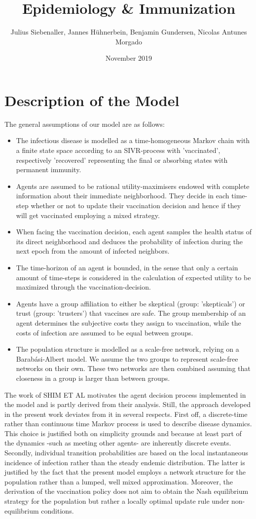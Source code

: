 \documentclass[11pt]{article}
\title{Epidemiology \& Immunization}
\author{Julius Siebenaller, Jannes Hühnerbein, Benjamin Gundersen, Nicolas Antunes Morgado}
\date{November 2019}
\begin{document}
\section{Description of the Model}


The general assumptions of our model are as follows:
\begin{itemize}
\item{The infectious disease is modelled as a time-homogeneous Markov chain with a finite state space according to an SIVR-process with 'vaccinated', respectively 'recovered' representing the final or absorbing states with permanent immunity.}
\item{Agents are assumed to be rational utility-maximisers endowed with complete information about their immediate neighborhood. They decide in each time-step whether or not to update their vaccination decision and hence if they will get vaccinated employing a mixed strategy.}
\item{When facing the vaccination decision, each agent samples the health status of its direct neighborhood and deduces the probability of infection during the next epoch from the amount of infected neighbors.}
\item{The time-horizon of an agent is bounded, in the sense that only a certain amount of time-steps is considered in the calculation of expected utility to be maximized through the vaccination-decision.}
\item{Agents have a group affiliation to either be skeptical (group: 'skepticals') or trust (group: 'trusters') that vaccines are safe. The group membership of an agent determines the subjective costs they assign to vaccination, while the costs of infection are assumed to be equal between groups.}
\item{The population structure is modelled as a scale-free network, relying on a Barabási-Albert model. We assume the two groups to represent scale-free networks on their own. These two networks are then combined assuming that closeness in a group is larger than between groups.}
\end{itemize}
The work of SHIM ET AL motivates the agent decision process implemented in the model and is partly derived from their analysis. Still, the approach developed in the present work deviates from it in several respects. First off, a discrete-time rather than continuous time Markov process is used to describe disease dynamics. This choice is justified both on simplicity grounds and because at least part of the dynamics -such as meeting other agents- are inherently discrete events. Secondly, individual transition probabilities are based on the local instantaneous incidence of infection rather than the steady endemic distribution. The latter is justified by the fact that the present model employs a network structure for the population rather than a lumped, well mixed approximation. Moreover, the derivation of the vaccination policy does not aim to obtain the Nash equilibrium strategy for the population but rather a locally optimal update rule under non-equilibrium conditions.
\end{document}
